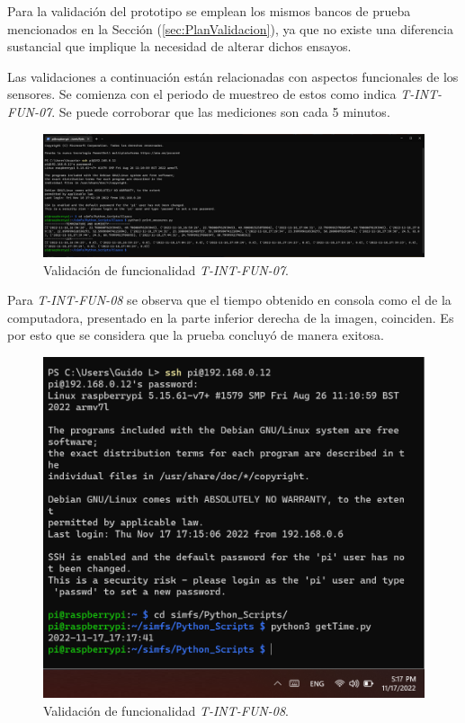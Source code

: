 Para la validación del prototipo se emplean los mismos bancos de prueba mencionados en la Sección (\ref{sec:PlanValidacion}), ya que no existe una diferencia sustancial que implique la necesidad de alterar dichos ensayos.

Las validaciones a continuación están relacionadas con aspectos funcionales de los sensores. Se comienza con el periodo de muestreo de estos como indica \textit{T-INT-FUN-07}. Se puede corroborar que las mediciones son cada 5 minutos.
\begin{figure}[H]
	\centering
    \includegraphics[width=1\linewidth]{ImagenesValidacion del prototipo/T-INT-FUN-07}
	\caption{Validación de funcionalidad \textit{T-INT-FUN-07}.}
\end{figure}

Para \textit{T-INT-FUN-08} se observa que el tiempo obtenido en consola como el de la computadora, presentado en la parte inferior derecha de la imagen, coinciden. Es por esto que se considera que la prueba concluyó de manera exitosa.
\begin{figure}[H]
	\centering
    \includegraphics[width=0.8\linewidth]{ImagenesValidacion del prototipo/TINTFUN8}
	\caption{Validación de funcionalidad \textit{T-INT-FUN-08}.}
\end{figure}

